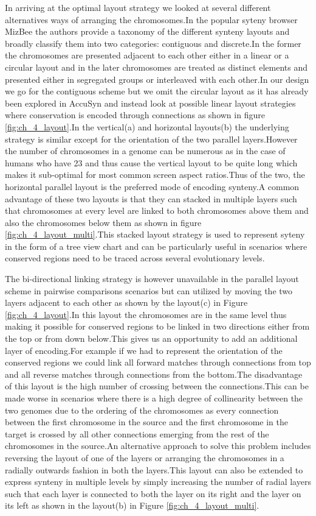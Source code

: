 In arriving at the optimal layout strategy we looked at several different alternatives ways of arranging the chromosomes.In the popular syteny browser MizBee\cite{Meyer2009} the authors provide a taxonomy of the different synteny layouts and broadly classify them into two categories: contiguous and discrete.In the former the chromosomes are presented adjacent to each other either in a linear or a circular layout and in the later chromosomes are treated as distinct elements and presented either in segregated groups or interleaved with each other.In our design we go for the contiguous scheme but we omit the circular layout as it has already been explored in AccuSyn\cite{accusyn}  and instead look at possible linear layout strategies where conservation is encoded through connections as shown in figure \ref{fig:ch_4_layout}.In the vertical(a) and horizontal layouts(b) the underlying strategy is similar except for the orientation of the two parallel layers.However the number of chromosomes in a genome can be numerous as in the case of humans who have 23 and thus cause the vertical layout to be quite long which makes it sub-optimal for most common screen aspect ratios.Thus of the two, the horizontal parallel layout is the preferred mode of encoding synteny.A common advantage of these two layouts is that they can stacked in multiple layers such that chromosomes at every level are linked to both chromosomes above them and also the chromosomes below them as shown in figure \ref{fig:ch_4_layout_multi}.This stacked layout strategy is used to represent syteny in the form of a tree view chart and can be particularly useful in scenarios where conserved regions need to be traced across several evolutionary levels.

The bi-directional linking strategy is however unavailable in the parallel layout scheme in pairwise comparisons scenarios but can utilized by moving the two layers adjacent to each other as shown by the layout(c) in Figure \ref{fig:ch_4_layout}.In this layout the chromosomes are in the same level thus making it possible for conserved regions to be linked in two directions either from the top or from down below.This gives us an opportunity to add an additional layer of encoding.For example if we had to represent the orientation of the conserved regions we could link all forward matches through connections from top and all reverse matches through connections from the bottom.The disadvantage of this layout is the high number of crossing between the connections.This can be made worse in scenarios where there is a high degree of collinearity between the two genomes due to the ordering of the chromosomes as every connection between the first chromosome in the source and the first chromosome in the target is crossed by all other connections emerging from the rest of the chromosomes in the source.An alternative approach to solve this problem includes reversing the layout of one of the layers or arranging the chromosomes in a radially outwards fashion in  both the layers.This layout can also be extended to express synteny in multiple levels by simply increasing the number of radial layers such that each layer is connected to both the layer on its right and the layer on its left as shown in the layout(b) in Figure \ref{fig:ch_4_layout_multi}.


